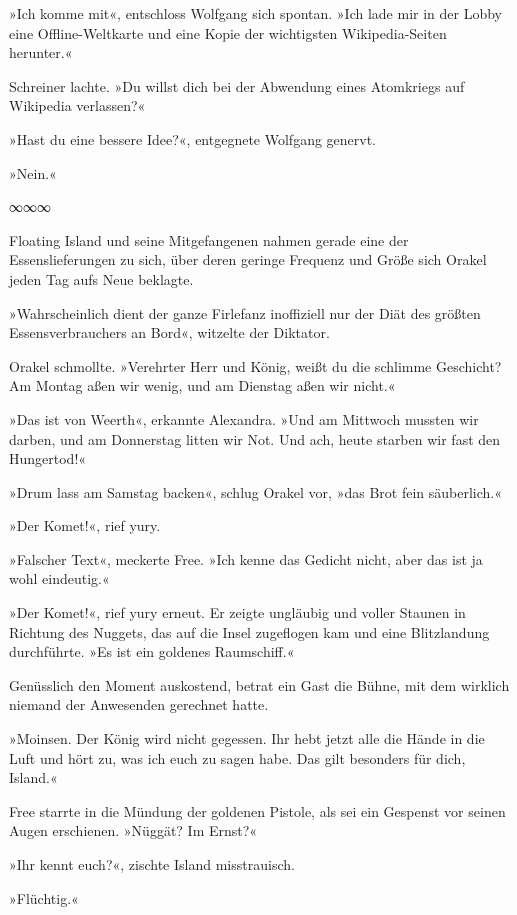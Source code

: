 »Ich komme mit«, entschloss Wolfgang sich spontan. »Ich lade mir in der Lobby eine Offline-Weltkarte und eine Kopie der wichtigsten Wikipedia-Seiten herunter.«

Schreiner lachte. »Du willst dich bei der Abwendung eines Atomkriegs auf Wikipedia verlassen?«

»Hast du eine bessere Idee?«, entgegnete Wolfgang genervt.

»Nein.«

\begin{center}
∞∞∞
\end{center}

Floating Island und seine Mitgefangenen nahmen gerade eine der Essenslieferungen zu sich, über deren geringe Frequenz und Größe sich Orakel jeden Tag aufs Neue beklagte.

»Wahrscheinlich dient der ganze Firlefanz inoffiziell nur der Diät des größten Essensverbrauchers an Bord«, witzelte der Diktator.

Orakel schmollte. »Verehrter Herr und König, weißt du die schlimme Geschicht? Am Montag aßen wir wenig, und am Dienstag aßen wir nicht.«

»Das ist von Weerth«, erkannte Alexandra. »Und am Mittwoch mussten wir darben, und am Donnerstag litten wir Not. Und ach, heute starben wir fast den Hungertod!«

»Drum lass am Samstag backen«, schlug Orakel vor, »das Brot fein säuberlich.«

»Der Komet!«, rief yury.

»Falscher Text«, meckerte Free. »Ich kenne das Gedicht nicht, aber das ist ja wohl eindeutig.«

»Der Komet!«, rief yury erneut. Er zeigte ungläubig und voller Staunen in Richtung des Nuggets, das auf die Insel zugeflogen kam und eine Blitzlandung durchführte. »Es ist ein goldenes Raumschiff.«

Genüsslich den Moment auskostend, betrat ein Gast die Bühne, mit dem wirklich niemand der Anwesenden gerechnet hatte.

»Moinsen. Der König wird nicht gegessen. Ihr hebt jetzt alle die Hände in die Luft und hört zu, was ich euch zu sagen habe. Das gilt besonders für dich, Island.«

Free starrte in die Mündung der goldenen Pistole, als sei ein Gespenst vor seinen Augen erschienen. »Nüggät? Im Ernst?«

»Ihr kennt euch?«, zischte Island misstrauisch.

»Flüchtig.«

